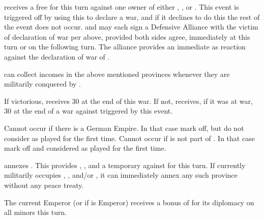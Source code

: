 \newpage\startevents






\phdipl
\aparag \FRA receives a free \CB for this turn against one owner of either
\provincePicardie, \provinceArtois, \provinceFlandre or \provinceHainaut.
This event is triggered off by \FRA using this \CB to declare a war, and if it
declines to do this the rest of the event does not occur.
\aparag \HOL and \ENG may each sign a Defensive Alliance with the victim of
\FRA declaration of war per above, provided both sides agree, immediately at
this turn or on the following turn.  The alliance provides an immediate \CB as
reaction against the declaration of war of \FRA.

\phadm
\aparag \FRA can collect incomes in the above mentioned provinces whenever
they are militarily conquered by \FRA.

\phpaix
\aparag If victorious, \FRA receives 30 \PV at the end of this war.
\aparag If not, \HOL receives, if it was at war, 30 \PV at the end of a war
against \FRA triggered by this event.





\condition{}
\aparag Cannot occur if there is a German Empire. In that case mark off, but
do not consider as played for the first time.
\aparag Cannot occur if \provinceAlsace is not part of \paysAlsace.  In that
case mark off and considered as played for the first time.

\phevnt
\aparag \FRA annexes \provinceAlsace. This provides \SPA, \HOL, \ENG and \AUS
a temporary \CB against \FRA for this turn.
\aparag If \FRA currently militarily occupies \provincePicardie,
\provinceRosselo,  and/or \provinceArtois, it can
immediately annex any such province without any peace treaty.

\phdipl
\aparag The current Emperor (or \SPA if \AUSmin is Emperor) receives a bonus
of  for its diplomacy on all \HRE minors this turn.




